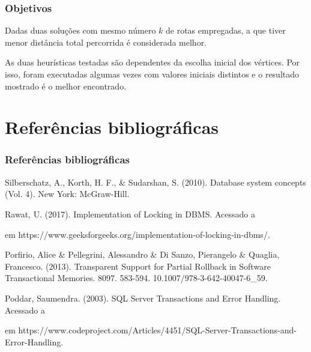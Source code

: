 \documentclass{beamer}
\begin{document}
\begin{frame} %
    \frametitle{Objetivos}

    Dadas duas soluções com mesmo número \(k\) de rotas empregadas, a que tiver menor distância total percorrida é considerada melhor.

    \medskip
    As duas heurísticas testadas são dependentes da escolha inicial dos vértices. Por isso, foram executadas algumas vezes com valores iniciais distintos e o resultado mostrado é o melhor encontrado.


\end{frame}

\section{Referências bibliográficas}

\begin{frame} %
    \frametitle{Referências bibliográficas}
    \footnotesize{
    \begin{thebibliography}{99} %
        Silberschatz, A., Korth, H. F., \& Sudarshan, S. (2010). Database system concepts (Vol. 4). New York: McGraw-Hill.

        Rawat, U. (2017). Implementation of Locking in DBMS. Acessado a \date{25/11/2018} em https://www.geeksforgeeks.org/implementation-of-locking-in-dbms/.

        Porfirio, Alice \& Pellegrini, Alessandro \& Di Sanzo, Pierangelo \& Quaglia, Francesco. (2013). Transparent Support for Partial Rollback in Software Transactional Memories. 8097. 583-594. 10.1007/978-3-642-40047-6\_59. 

        Poddar, Saumendra. (2003). SQL Server Transactions and Error Handling. Acessado a \date{25/11/2018} em https://www.codeproject.com/Articles/4451/SQL-Server-Transactions-and-Error-Handling.
    \end{thebibliography}
    }
\end{frame}
\end{document}
